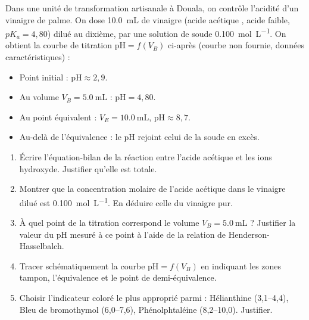 \documentclass[11pt]{article}
\begin{document}
\begin{exercice}
Dans une unité de transformation artisanale à Douala, on contrôle l'acidité d'un vinaigre de palme. On dose \SI{10,0}{\milli\liter} de vinaigre (acide acétique , acide faible, $pK_a = 4,80$) dilué au dixième, par une solution de soude  \SI{0,100}{\mole\per\liter}. On obtient la courbe de titration $\text{pH} = f(V_B)$ ci-après (courbe non fournie, données caractéristiques) :
\begin{itemize}
    \item Point initial : $\text{pH} \approx 2,9$.
    \item Au volume $V_B = \SI{5,0}{\milli\liter}$ : $\text{pH} = 4,80$.
    \item Au point équivalent : $V_{E} = \SI{10,0}{\milli\liter}$, $\text{pH} \approx 8,7$.
    \item Au-delà de l'équivalence : le pH rejoint celui de la soude en excès.
\end{itemize}

\begin{enumerate}
    \item Écrire l'équation-bilan de la réaction entre l'acide acétique et les ions hydroxyde. Justifier qu'elle est totale.
    \item Montrer que la concentration molaire de l'acide acétique dans le vinaigre dilué est \SI{0,100}{\mole\per\liter}. En déduire celle du vinaigre pur.
    \item À quel point de la titration correspond le volume $V_B = \SI{5,0}{\milli\liter}$ ? Justifier la valeur du pH mesuré à ce point à l'aide de la relation de Henderson-Hasselbalch.
    \item Tracer schématiquement la courbe $\text{pH} = f(V_B)$ en indiquant les zones tampon, l'équivalence et le point de demi-équivalence.
    \item Choisir l'indicateur coloré le plus approprié parmi : Hélianthine (3,1--4,4), Bleu de bromothymol (6,0--7,6), Phénolphtaléine (8,2--10,0). Justifier.
\end{enumerate}
\end{exercice}
\end{document}
